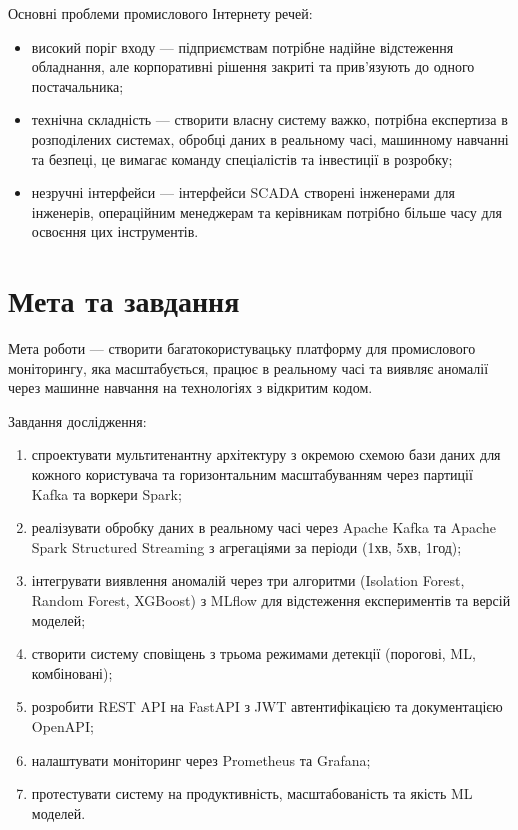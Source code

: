 Основні проблеми промислового Інтернету речей:

\begin{itemize}
    \item високий поріг входу --- підприємствам потрібне надійне відстеження обладнання, але корпоративні рішення закриті та прив'язують до одного постачальника;
    \item технічна складність --- створити власну систему важко, потрібна експертиза в розподілених системах, обробці даних в реальному часі, машинному навчанні та безпеці, це вимагає команду спеціалістів та інвестиції в розробку;
    \item незручні інтерфейси --- інтерфейси SCADA створені інженерами для інженерів, операційним менеджерам та керівникам потрібно більше часу для освоєння цих інструментів.
\end{itemize}


\section{Мета та завдання}

Мета роботи --- створити багатокористувацьку платформу для промислового моніторингу, яка масштабується, працює в реальному часі та виявляє аномалії через машинне навчання на технологіях з відкритим кодом.

Завдання дослідження:

\begin{enumerate}
    \item спроектувати мультитенантну архітектуру з окремою схемою бази даних для кожного користувача та горизонтальним масштабуванням через партиції Kafka та воркери Spark;
    \item реалізувати обробку даних в реальному часі через Apache Kafka та Apache Spark Structured Streaming з агрегаціями за періоди (1хв, 5хв, 1год);
    \item інтегрувати виявлення аномалій через три алгоритми (Isolation Forest, Random Forest, XGBoost) з MLflow для відстеження експериментів та версій моделей;
    \item створити систему сповіщень з трьома режимами детекції (порогові, ML, комбіновані);
    \item розробити REST API на FastAPI з JWT автентифікацією та документацією OpenAPI;
    \item налаштувати моніторинг через Prometheus та Grafana;
    \item протестувати систему на продуктивність, масштабованість та якість ML моделей.
\end{enumerate}


